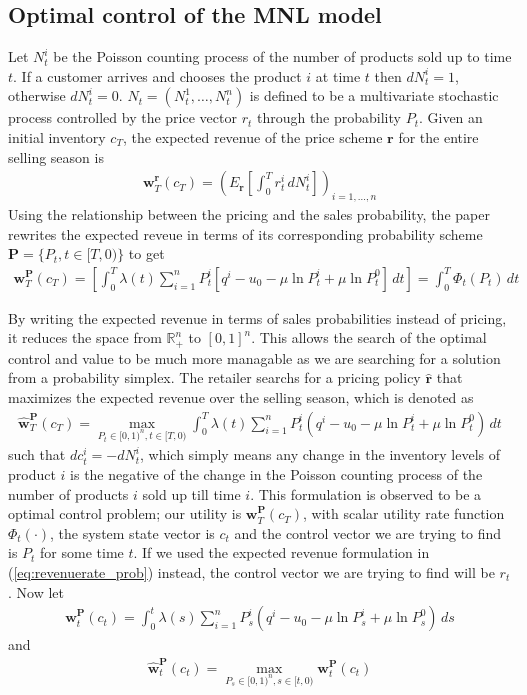 \subsection{Optimal control of the MNL model}
Let $N_t^i$ be the Poisson counting process of the number of products sold up to time $t$. If a customer arrives and chooses the product $i$ at time $t$ then $dN_t^i = 1$, otherwise $dN_t^i=0$. $N_t = (N_t^1, \ldots, N_t^n)$ is defined to be a multivariate stochastic process controlled by the price vector $r_t$ through the probability $P_t$. Given an initial inventory $c_T$, the expected revenue of the price scheme $\mathbf{r}$ 	for the entire selling season is 
\begin{align}
\mathbf{w}_T^{\mathbf{r}}(c_T) = \left(E_{\mathbf{r}}\left[\int_0^Tr^i_t\,dN^i_t\right]\right)_{i=1,\ldots,n}
\end{align}
Using the relationship between the pricing and the sales probability, the paper rewrites the expected reveue in terms of its corresponding probability scheme $\mathbf{P}=\{P_t, t \in [T,0)\}$ to get
\begin{align}
\mathbf{w}^{\mathbf{P}}_T(c_T) = \left[\int_{0}^{T}\lambda(t) \sum_{i=1}^{n}P_t^i[q^i-u_0-\mu \ln P_t^i + \mu \ln P_t^0]\,dt\right] = \int_{0}^{T}\Phi_t(P_t)\,dt
\end{align}

By writing the expected revenue in terms of sales probabilities instead of pricing, it reduces the space from $\mathbb{R}^n_+$ to $[0,1]^n$. This allows the search of the optimal control and value to be much more managable  as we are searching for a solution from a probability simplex. The retailer searchs for a pricing policy $\hat{\mathbf{r}}$ that maximizes the expected revenue over the selling season, which is denoted as
\begin{align}
\hat{\mathbf{w}}_T^{\mathbf{P}}(c_T) = \max_{P_t \in [0,1)^n, t \in [T,0)}\int_{0}^{T}\lambda(t)\sum_{i=1}^{n}P_t^i\left(q^i-u_0-\mu \ln P_t^i+\mu \ln P_t^0\right)\, dt
\end{align}
such that $dc_t^i = -dN_t^i$, which simply means any change in the inventory levels of product $i$ is the negative of the change in the Poisson counting process of the number of products $i$ sold up till time $i$. This formulation is observed to be a optimal control problem; our utility is $\mathbf{w}_T^{\mathbf{P}}(c_T)$, with scalar utility rate function $\Phi_t(\cdot)$, the system state vector is $c_t$ and the control vector we are trying to find is $P_t$ for some time $t$. If we used the expected revenue formulation in (\ref{eq:revenuerate_prob}) instead, the control vector we are trying to find will be $r_t$. Now let
\begin{align}
\mathbf{w}_t^{\mathbf{P}}(c_t) = \int_{0}^{t}\lambda(s)\sum_{i=1}^{n}P_s^i\left(q^i-u_0-\mu \ln P_s^i+\mu \ln P_s^0\right)\, ds
\end{align}
and 
\begin{align}
\hat{\mathbf{w}}_t^{\mathbf{P}}(c_t) = \max_{P_s \in [0,1)^n, s \in [t,0)} \mathbf{w}_t^{\mathbf{P}}(c_t)
\end{align}

